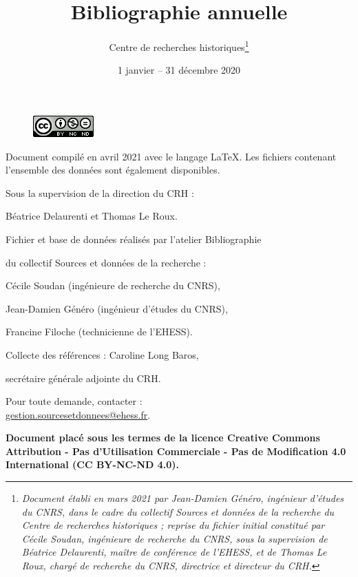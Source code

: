 \documentclass{article}
\title{\textbf{Bibliographie annuelle}}
\author{Centre de recherches historiques\footnote{\textit{Document établi en mars 2021 par Jean-Damien Généro, ingénieur d'études du CNRS, dans le cadre du collectif Sources et données de la recherche du Centre de recherches historiques ; reprise du fichier initial constitué par Cécile Soudan, ingénieure de recherche du CNRS, sous la supervision de Béatrice Delaurenti, maître de conférence de l'EHESS, et de 
Thomas Le Roux, chargé de recherche du CNRS, directrice et directeur du CRH.}}}
\date{1\up{er} janvier -- 31 décembre 2020}
\begin{document}
\renewcommand{\contentsname}{Sommaire}


\newpage
\thispagestyle{empty}

\begin{figure}
    \centering
    \includegraphics{img/licence-cc-icon.png}
    \label{fig:licence}
\end{figure}

\bigskip

\bigskip
\begin{center}
\begin{itshape}

Document compilé en avril 2021 avec le langage \LaTeX. Les fichiers  contenant l'ensemble des données sont également disponibles.

\medskip

Sous la supervision de la direction du CRH :

Béatrice Delaurenti et Thomas Le Roux.

\medskip

Fichier et base de données réalisés par l'atelier \og Bibliographie \fg

du collectif \og Sources et données de la recherche \fg :

Cécile Soudan (ingénieure de recherche du CNRS),

Jean-Damien Généro (ingénieur d’études du CNRS),

Francine Filoche (technicienne de l’EHESS).

\medskip

Collecte des références : Caroline Long Baros,

secrétaire générale adjointe du CRH.

\medskip

Pour toute demande, contacter :\\\url{gestion.sourcesetdonnees@ehess.fr}.

\end{itshape}

\bigskip

\bigskip

    \textbf{Document placé sous les termes de la licence Creative Commons Attribution - Pas d'Utilisation Commerciale - Pas de Modification 4.0 International (CC BY-NC-ND 4.0).}
\end{center}
\end{document}
